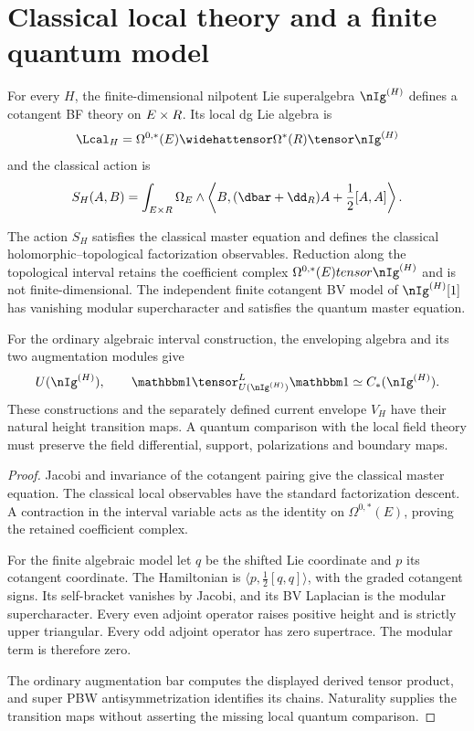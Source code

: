 \section{Classical local theory and a finite quantum model}
For every $H$, the finite-dimensional nilpotent Lie superalgebra $\nIg^{(H)}$ defines a cotangent BF theory on $E\times R$.  Its local dg Lie algebra is
\[
 \Lcal_H=\Omega^{0,*}(E)\widehattensor\Omega^*(\R)\tensor\nIg^{(H)}
\]
and the classical action is
\[
 S_H(A,B)=\int_{E\times\R}\Omega_E\wedge
 \left\langle B,(\dbar+\dd_{\R})A+\frac12[A,A]\right\rangle .
\]

\begin{theorem}
The action $S_H$ satisfies the classical master equation and defines the classical holomorphic--topological factorization observables.
Reduction along the topological interval retains the coefficient complex
$\Omega^{0,*}(E)\otimes\nIg^{(H)}$ and is not finite-dimensional.
The independent finite cotangent BV model of $\nIg^{(H)}[1]$ has vanishing modular supercharacter and satisfies the quantum master equation.

For the ordinary algebraic interval construction, the enveloping algebra and its two augmentation modules give
\[
 U(\nIg^{(H)}),\qquad
 \mathbbm1\tensor^{\mathbb L}_{U(\nIg^{(H)})}\mathbbm1
 \simeq C_*(\nIg^{(H)}).
\]
These constructions and the separately defined current envelope $V_H$ have their natural height transition maps.
A quantum comparison with the local field theory must preserve the field differential, support, polarizations and boundary maps.
\end{theorem}
\begin{proof}
Jacobi and invariance of the cotangent pairing give the classical master equation.
The classical local observables have the standard factorization descent.
A contraction in the interval variable acts as the identity on $\Omega^{0,*}(E)$, proving the retained coefficient complex.

For the finite algebraic model let $q$ be the shifted Lie coordinate and $p$ its cotangent coordinate.
The Hamiltonian is $\langle p,\tfrac12[q,q]\rangle$, with the graded cotangent signs.
Its self-bracket vanishes by Jacobi, and its BV Laplacian is the modular supercharacter.
Every even adjoint operator raises positive height and is strictly upper triangular. Every odd adjoint operator has zero supertrace.
The modular term is therefore zero.

The ordinary augmentation bar computes the displayed derived tensor product, and super PBW antisymmetrization identifies its chains.
Naturality supplies the transition maps without asserting the missing local quantum comparison.
\end{proof}

